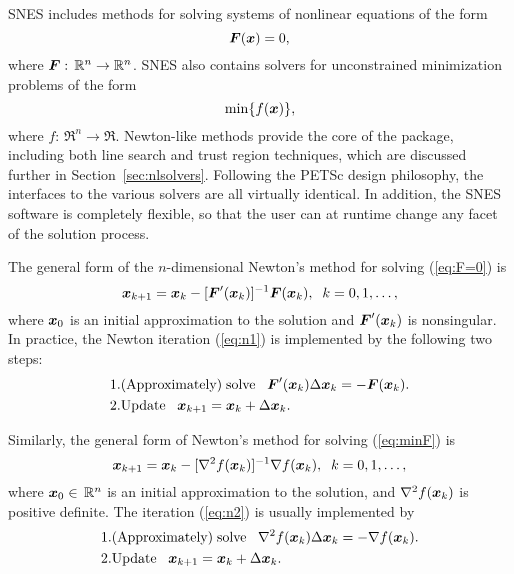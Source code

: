 SNES includes methods for solving systems of nonlinear equations of the form 
\begin{equation}
\mbox{\boldmath \(F\)}(\mbox{\boldmath \(x\)}) = 0,
\label{eq:F=0}
\end{equation}
where $\mbox{\boldmath \(F\)}: \, \mathbb R^n \rightarrow \mathbb R^n$. SNES also contains solvers for
unconstrained minimization problems of the form
\begin{equation}
{\rm min} \{ f(\mbox{\boldmath \(x\)}) \},
\label{eq:minF}
\end{equation}
where $f: \, \Re^n \rightarrow \Re$.
Newton-like methods provide the core of the package, including
 both line search  
and trust region  techniques, which are discussed
further in Section~\ref{sec:nlsolvers}. Following the
PETSc design philosophy, the interfaces to the various solvers are all
virtually identical. In addition, the SNES software is completely
flexible, so that the user can at runtime change any facet of the
solution process.

The general form of the $n$-dimensional Newton's method for solving
(\ref{eq:F=0}) is
\begin{equation}
     \mbox{\boldmath \(x\)}_{k+1} = \mbox{\boldmath \(x\)}_k - [ \mbox{\boldmath \(F\)}'(\mbox{\boldmath \(x\)}_k)]^{-1} \mbox{\boldmath \(F\)}(\mbox{\boldmath \(x\)}_k), \;\; k=0,1, \ldots, 
\label{eq:n1}
\end{equation}
where $ \mbox{\boldmath \(x\)}_0 $ is an initial approximation to the solution and   
$ \mbox{\boldmath \(F\)}'(\mbox{\boldmath \(x\)}_k) $ is nonsingular.  
In practice, the Newton iteration (\ref{eq:n1}) is implemented by
the following two steps:
\begin{eqnarray}
  1. & {\rm (Approximately) \;solve\;\;\;} \mbox{\boldmath \(F\)}'(\mbox{\boldmath \(x\)}_k) \Delta \mbox{\boldmath \(x\)}_k = -\mbox{\boldmath \(F\)}(\mbox{\boldmath \(x\)}_k).\\
  2. & {\rm Update\;\;\;} \mbox{\boldmath \(x\)}_{k+1} = \mbox{\boldmath \(x\)}_k + \Delta \mbox{\boldmath \(x\)}_k. \hspace{.225in}
\end{eqnarray}

Similarly, the general form of Newton's method for solving (\ref{eq:minF}) is
\begin{equation}
    \mbox{\boldmath \(x\)}_{k+1} = \mbox{\boldmath \(x\)}_k - [ \nabla^2 f(\mbox{\boldmath \(x\)}_k)]^{-1} \nabla f(\mbox{\boldmath \(x\)}_k), \;\;
          k=0,1, \ldots,
\label{eq:n2}
\end{equation}
where $ \mbox{\boldmath \(x\)}_0 \in \, \mathbb R^n $ is an initial approximation
to the solution, and $ \nabla^2 f(\mbox{\boldmath \(x\)}_k) $ is positive definite.
The iteration (\ref{eq:n2}) is usually implemented by
\begin{eqnarray}
  1. & {\rm (Approximately) \;solve\;\;\;} \nabla^2 f(\mbox{\boldmath \(x\)}_k) \Delta \mbox{\boldmath \(x\)}_k = -\nabla f(\mbox{\boldmath \(x\)}_k).\\
  2. & {\rm Update\;\;\;} \mbox{\boldmath \(x\)}_{k+1} = \mbox{\boldmath \(x\)}_k + \Delta \mbox{\boldmath \(x\)}_k. \hspace{.325in}
\end{eqnarray}

